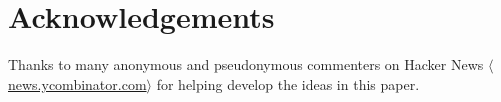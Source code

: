 \documentclass[conference]{IEEEtran}
\newcommand{\URL}[1]{$\langle$\url{#1}$\rangle$}
\begin{document}
\section*{Acknowledgements}

Thanks to many anonymous and pseudonymous commenters on Hacker News
\URL{news.ycombinator.com} for helping develop the ideas in this paper.






\end{document}
